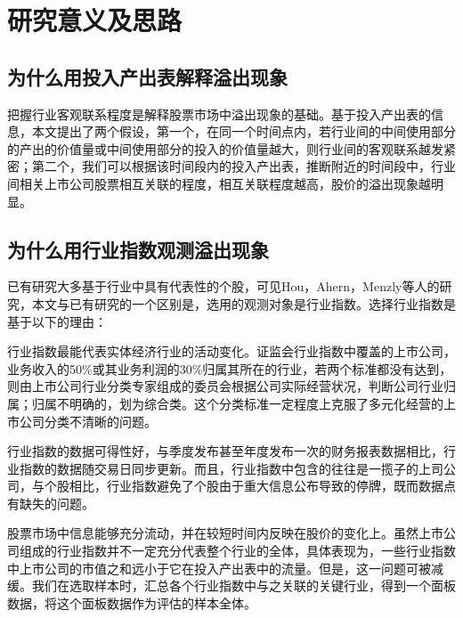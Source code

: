 \documentclass{sysuthesis}
\begin{document}
\section{研究意义及思路}

\subsection{为什么用投入产出表解释溢出现象}

把握行业客观联系程度是解释股票市场中溢出现象的基础。基于投入产出表的信息，本文提出了两个假设，第一个，在同一个时间点内，若行业间的中间使用部分的产出的价值量或中间使用部分的投入的价值量越大，则行业间的客观联系越发紧密；第二个，我们可以根据该时间段内的投入产出表，推断附近的时间段中，行业间相关上市公司股票相互关联的程度，相互关联程度越高，股价的溢出现象越明显。
\subsection{为什么用行业指数观测溢出现象}

已有研究大多基于行业中具有代表性的个股，可见Hou\cite{kewei_hou_industry_2007}，Ahern\cite{ahern2013network}，Menzly\cite{menzly_market_2010}等人的研究，本文与已有研究的一个区别是，选用的观测对象是行业指数。选择行业指数是基于以下的理由：

行业指数最能代表实体经济行业的活动变化。证监会行业指数中覆盖的上市公司，业务收入的50\%或其业务利润的30\%归属其所在的行业，若两个标准都没有达到，则由上市公司行业分类专家组成的委员会根据公司实际经营状况，判断公司行业归属；归属不明确的，划为综合类\cite{_2012_????}。这个分类标准一定程度上克服了多元化经营的上市公司分类不清晰的问题。

行业指数的数据可得性好，与季度发布甚至年度发布一次的财务报表数据相比，行业指数的数据随交易日同步更新。而且，行业指数中包含的往往是一揽子的上司公司，与个股相比，行业指数避免了个股由于重大信息公布导致的停牌，既而数据点有缺失的问题。

股票市场中信息能够充分流动，并在较短时间内反映在股价的变化上。虽然上市公司组成的行业指数并不一定充分代表整个行业的全体，具体表现为，一些行业指数中上市公司的市值之和远小于它在投入产出表中的流量。但是，这一问题可被减缓。我们在选取样本时，汇总各个行业指数中与之关联的关键行业，得到一个面板数据，将这个面板数据作为评估的样本全体。
\end{document}
